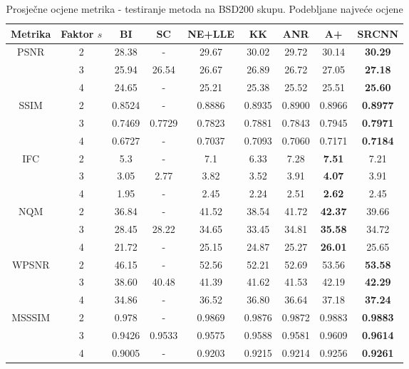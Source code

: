 \documentclass[12pt]{report}
\numberwithin{equation}{section}
\begin{document}
\begin{table}[h!]
\centering
\begin{tabular}{ |c|c|c|c|c|c|c|c|c| } 
\hline
Metrika & Faktor $s$ & BI & SC & NE+LLE & KK & ANR & A+ & SRCNN \\
\hline
\multirow{3}{*}{PSNR}& 2 & 28.38 & - & 29.67 & 30.02 & 29.72 & 30.14 & \textbf{30.29}\\
            & 3 & 25.94 & 26.54 & 26.67 & 26.89 & 26.72 &27.05 & \textbf{27.18} \\
& 4 & 24.65 & - & 25.21 & 25.38 & 25.52 & 25.51 & \textbf{25.60} \\ 
\hline
\multirow{3}{*}{SSIM}& 2 & 0.8524 & - & 0.8886 & 0.8935 & 0.8900 & 0.8966 & \textbf{0.8977}\\
  &           3 & 0.7469 & 0.7729 & 0.7823 & 0.7881 & 0.7843 & 0.7945 & \textbf{0.7971} \\
& 4 & 0.6727 & - & 0.7037 & 0.7093 & 0.7060 & 0.7171 & \textbf{0.7184} \\ 
\hline
\multirow{3}{*}{IFC}& 2 & 5.3 & - & 7.1 & 6.33 & 7.28 & \textbf{7.51} & 7.21\\
  &           3 & 3.05 & 2.77 & 3.82 & 3.52 & 3.91 & \textbf{4.07} & 3.91 \\
& 4 & 1.95 & - & 2.45 & 2.24 & 2.51 & \textbf{2.62} & 2.45 \\ 
\hline
\multirow{3}{*}{NQM}& 2 & 36.84 & - & 41.52 & 38.54 & 41.72 & \textbf{42.37} & 39.66\\
  &           3 & 28.45 & 28.22 & 34.65 & 33.45 & 34.81 & \textbf{35.58} & 34.72 \\
& 4 & 21.72 & - & 25.15 & 24.87 & 25.27 & \textbf{26.01} & 25.65 \\ 
\hline
\multirow{3}{*}{WPSNR}& 2 & 46.15 & - & 52.56 & 52.21 & 52.69 & 53.56 & \textbf{53.58}\\
  &           3 & 38.60 & 40.48 & 41.39 & 41.62 & 41.53 & 42.19 & \textbf{42.29} \\
& 4 & 34.86 & - & 36.52 & 36.80 & 36.64 & 37.18 & \textbf{37.24} \\ 
\hline
\multirow{3}{*}{MSSSIM}& 2 & 0.978 & - & 0.9869 & 0.9876 & 0.9872 & 0.9883 & \textbf{0.9883}\\
  &           3 & 0.9426 & 0.9533 & 0.9575 & 0.9588 & 0.9581 & 0.9609 & \textbf{0.9614} \\
& 4 & 0.9005 & - & 0.9203 & 0.9215 & 0.9214 & 0.9256 & \textbf{0.9261} \\ 
\hline
\end{tabular}
\caption{Prosječne ocjene metrika - testiranje metoda na BSD200 skupu. Podebljane najveće ocjene}
\label{table:3}
\end{table}
\end{document}

